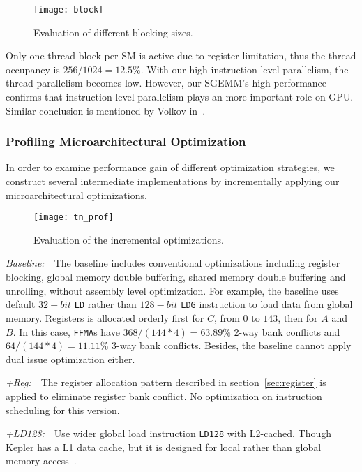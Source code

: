 \begin{figure}[htbp]
\begin{center}
\texttt{[image: block]}
    \caption{Evaluation of different blocking sizes.} %
\label{fig:block}
\end{center}
\end{figure}

Only one thread block per SM is active due to register limitation, thus the thread occupancy is $256/1024=12.5\%$.
With our high instruction level parallelism, the thread parallelism becomes low.
However, our SGEMM's high performance confirms that instruction level parallelism plays an more important role on GPU.
Similar conclusion is mentioned by Volkov in~\cite{volkov2010better}.

\subsubsection{Profiling Microarchitectural Optimization}

In order to examine performance gain of different optimization strategies, we construct several intermediate 
implementations by incrementally applying our microarchitectural optimizations.
\begin{figure}[htbp]
\begin{center}
\texttt{[image: tn\_prof]}
    \caption{Evaluation of the incremental optimizations.}
\label{fig:th_prof}
\end{center}
\end{figure}

{\it Baseline:}~~The baseline includes conventional optimizations including register blocking, global
memory double buffering, shared memory double buffering and unrolling, without assembly level optimization.
For example, the baseline uses default $32-bit$ {\tt LD} rather than $128-bit$ {\tt LDG} instruction to load data from global memory.
Registers is allocated orderly first for $C$, from $0$ to $143$, then for $A$ and $B$. 
In this case, {\tt FFMA}s have $368/(144*4)=63.89\%$ 2-way bank conflicts and $64/(144*4)=11.11\%$ 3-way bank conflicts. 
Besides, the baseline cannot apply dual issue optimization either.

{\it +Reg:}~~The register allocation pattern described in section~\ref{sec:register} is applied to eliminate register bank conflict. 
No optimization on instruction scheduling for this version.

{\it +LD128:}~~Use wider global load instruction {\tt LD128} with L2-cached.
Though Kepler has a L1 data cache, but it is designed for local rather than global memory access~\cite{gk110}.

